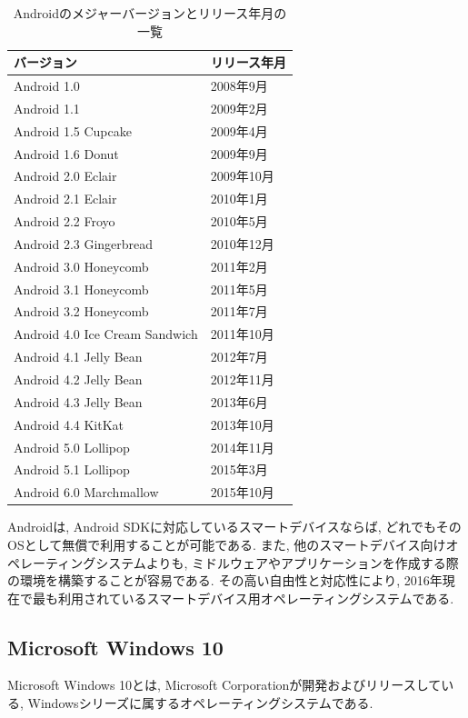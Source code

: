 \begin{table}[htb]
\begin{center}
\begin{tabular}{|l|l|} \hline
バージョン & リリース年月 \\ \hline \hline
Android 1.0 & 2008年9月 \\ \hline
Android 1.1 & 2009年2月 \\ \hline
Android 1.5 Cupcake & 2009年4月 \\ \hline
Android 1.6 Donut & 2009年9月 \\ \hline
Android 2.0 Eclair & 2009年10月 \\ \hline
Android 2.1 Eclair & 2010年1月 \\ \hline
Android 2.2 Froyo & 2010年5月 \\ \hline
Android 2.3 Gingerbread & 2010年12月 \\ \hline
Android 3.0 Honeycomb & 2011年2月 \\ \hline
Android 3.1 Honeycomb & 2011年5月 \\ \hline
Android 3.2 Honeycomb & 2011年7月 \\ \hline
Android 4.0 Ice Cream Sandwich & 2011年10月 \\ \hline
Android 4.1 Jelly Bean & 2012年7月 \\ \hline
Android 4.2 Jelly Bean & 2012年11月 \\ \hline
Android 4.3 Jelly Bean & 2013年6月 \\ \hline
Android 4.4 KitKat & 2013年10月 \\ \hline
Android 5.0 Lollipop & 2014年11月 \\ \hline
Android 5.1 Lollipop & 2015年3月 \\ \hline
Android 6.0 Marchmallow & 2015年10月 \\ \hline
\end{tabular}
\caption{Androidのメジャーバージョンとリリース年月の一覧}
\end{center}
\end{table}

Androidは, Android SDKに対応しているスマートデバイスならば, どれでもそのOSとして無償で利用することが可能である.
また, 他のスマートデバイス向けオペレーティングシステムよりも, ミドルウェアやアプリケーションを作成する際の環境を構築することが容易である.
その高い自由性と対応性により, 2016年現在で最も利用されているスマートデバイス用オペレーティングシステムである.

\subsection{Microsoft Windows 10}
Microsoft Windows 10とは, Microsoft Corporationが開発およびリリースしている, Windowsシリーズに属するオペレーティングシステムである.

